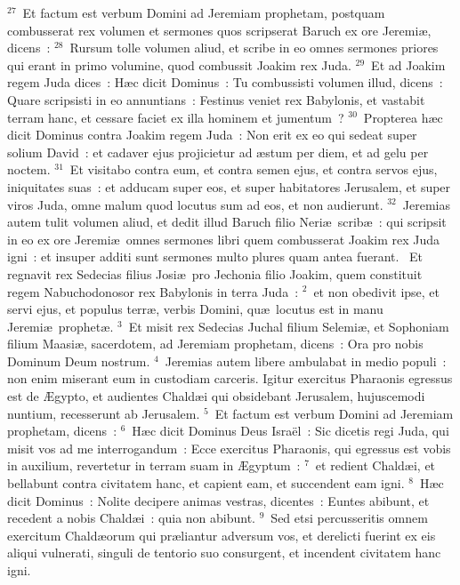 ${}^{27}$~Et factum est verbum Domini ad Jeremiam prophetam, postquam combusserat rex volumen et sermones quos scripserat Baruch ex ore Jeremi\ae , dicens~:
${}^{28}$~Rursum tolle volumen aliud, et scribe in eo omnes sermones priores qui erant in primo volumine, quod combussit Joakim rex Juda.
${}^{29}$~Et ad Joakim regem Juda dices~: H\ae c dicit Dominus~: Tu combussisti volumen illud, dicens~: Quare scripsisti in eo annuntians~: Festinus veniet rex Babylonis, et vastabit terram hanc, et cessare faciet ex illa hominem et jumentum~?
${}^{30}$~Propterea h\ae c dicit Dominus contra Joakim regem Juda~: Non erit ex eo qui sedeat super solium David~: et cadaver ejus projicietur ad \ae stum per diem, et ad gelu per noctem.
${}^{31}$~Et visitabo contra eum, et contra semen ejus, et contra servos ejus, iniquitates suas~: et adducam super eos, et super habitatores Jerusalem, et super viros Juda, omne malum quod locutus sum ad eos, et non audierunt.
${}^{32}$~Jeremias autem tulit volumen aliud, et dedit illud Baruch filio Neri\ae\ scrib\ae~: qui scripsit in eo ex ore Jeremi\ae\ omnes sermones libri quem combusserat Joakim rex Juda igni~: et insuper additi sunt sermones multo plures quam antea fuerant.
~Et regnavit rex Sedecias filius Josi\ae\ pro Jechonia filio Joakim, quem constituit regem Nabuchodonosor rex Babylonis in terra Juda~:
${}^{2}$~et non obedivit ipse, et servi ejus, et populus terr\ae , verbis Domini, qu\ae\ locutus est in manu Jeremi\ae\ prophet\ae .
${}^{3}$~Et misit rex Sedecias Juchal filium Selemi\ae , et Sophoniam filium Maasi\ae , sacerdotem, ad Jeremiam prophetam, dicens~: Ora pro nobis Dominum Deum nostrum.
${}^{4}$~Jeremias autem libere ambulabat in medio populi~: non enim miserant eum in custodiam carceris. Igitur exercitus Pharaonis egressus est de \AE gypto, et audientes Chald\ae i qui obsidebant Jerusalem, hujuscemodi nuntium, recesserunt ab Jerusalem.
${}^{5}$~Et factum est verbum Domini ad Jeremiam prophetam, dicens~:
${}^{6}$~H\ae c dicit Dominus Deus Isra\"el~: Sic dicetis regi Juda, qui misit vos ad me interrogandum~: Ecce exercitus Pharaonis, qui egressus est vobis in auxilium, revertetur in terram suam in \AE gyptum~:
${}^{7}$~et redient Chald\ae i, et bellabunt contra civitatem hanc, et capient eam, et succendent eam igni.
${}^{8}$~H\ae c dicit Dominus~: Nolite decipere animas vestras, dicentes~: Euntes abibunt, et recedent a nobis Chald\ae i~: quia non abibunt.
${}^{9}$~Sed etsi percusseritis omnem exercitum Chald\ae orum qui pr\ae liantur adversum vos, et derelicti fuerint ex eis aliqui vulnerati, singuli de tentorio suo consurgent, et incendent civitatem hanc igni.
